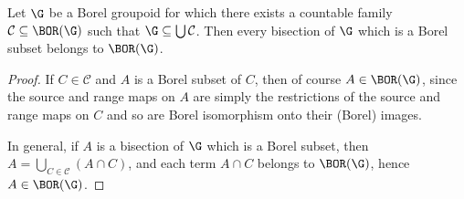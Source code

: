 
\begin{proposition}\label{propositionwheneveryborelbisectionisborelbisection}
Let $\G$ be a Borel groupoid for which there exists a countable family $\mathcal{C}\subseteq\BOR(\G)$ such that $\G\subseteq\bigcup\mathcal{C}$. Then every bisection of $\G$ which is a Borel subset belongs to $\BOR(\G)$.
\end{proposition}
\begin{proof}
If $C\in\mathcal{C}$ and $A$ is a Borel subset of $C$, then of course $A\in\BOR(\G)$, since the source and range maps on $A$ are simply the restrictions of the source and range maps on $C$ and so are Borel isomorphism onto their (Borel) images.

In general, if $A$ is a bisection of $\G$ which is a Borel subset, then $A=\bigcup_{C\in\mathcal{C}}(A\cap C)$, and each term $A\cap C$ belongs to $\BOR(\G)$, hence $A\in\BOR(\G)$.\qedhere
\end{proof}


